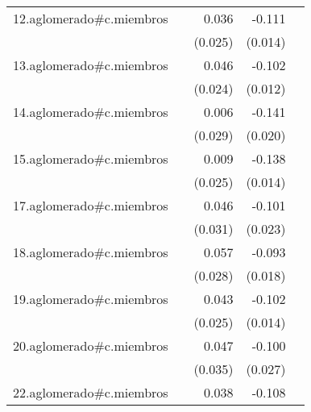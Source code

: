 {\begin{longtable}{l*{4}{D{.}{.}{-1}}}
\addlinespace
12.aglomerado#c.miembros&                     &       0.036         &      -0.111\sym{***}&                     \\
            &                     &     (0.025)         &     (0.014)         &                     \\
\addlinespace
13.aglomerado#c.miembros&                     &       0.046         &      -0.102\sym{***}&                     \\
            &                     &     (0.024)         &     (0.012)         &                     \\
\addlinespace
14.aglomerado#c.miembros&                     &       0.006         &      -0.141\sym{***}&                     \\
            &                     &     (0.029)         &     (0.020)         &                     \\
\addlinespace
15.aglomerado#c.miembros&                     &       0.009         &      -0.138\sym{***}&                     \\
            &                     &     (0.025)         &     (0.014)         &                     \\
\addlinespace
17.aglomerado#c.miembros&                     &       0.046         &      -0.101\sym{***}&                     \\
            &                     &     (0.031)         &     (0.023)         &                     \\
\addlinespace
18.aglomerado#c.miembros&                     &       0.057\sym{*}  &      -0.093\sym{***}&                     \\
            &                     &     (0.028)         &     (0.018)         &                     \\
\addlinespace
19.aglomerado#c.miembros&                     &       0.043         &      -0.102\sym{***}&                     \\
            &                     &     (0.025)         &     (0.014)         &                     \\
\addlinespace
20.aglomerado#c.miembros&                     &       0.047         &      -0.100\sym{***}&                     \\
            &                     &     (0.035)         &     (0.027)         &                     \\
\addlinespace
22.aglomerado#c.miembros&                     &       0.038         &      -0.108\sym{***}&                     \\

\end{longtable}}
